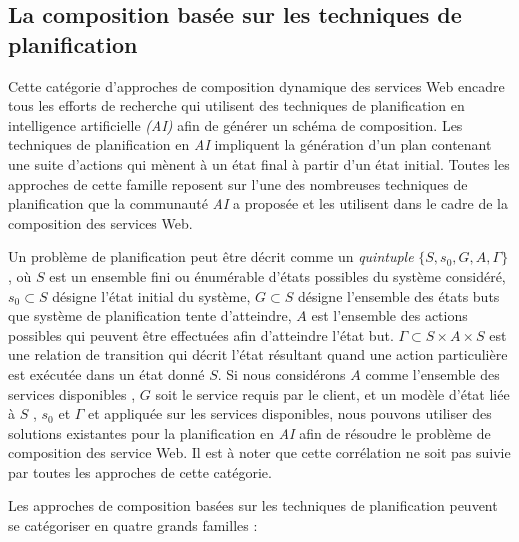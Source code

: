   \subsection{La composition basée sur les techniques de
    planification}
  \label{sec:tech-de-plan}
  Cette catégorie d'approches de composition dynamique des services Web
  encadre tous les efforts de recherche qui utilisent des techniques
  de planification en intelligence artificielle \textit{(AI)} afin de
  générer un schéma de composition. Les techniques de planification en
  \textit{AI} impliquent la génération d'un plan contenant une suite
  d'actions qui mènent à un état final à partir d'un état
  initial. Toutes les approches de cette famille reposent sur l'une
  des nombreuses techniques de planification que la communauté
  \textit{AI} a proposée et les utilisent dans le cadre de la
  composition des services Web.\medskip

  Un problème de planification peut être décrit comme un
  \textit{quintuple } \textit{$\{S, s_0,G, A, \Gamma\}$}
  \cite{carman2003web}, où $S$ est un ensemble fini ou énumérable
  d'états possibles du système considéré, $s_0\subset S$ désigne
  l'état initial du système, $G\subset S$ désigne l'ensemble des états
  buts que système de planification tente d'atteindre, $A$ est
  l'ensemble des actions possibles qui peuvent être effectuées afin
  d'atteindre l'état but.  \textit{$\Gamma \subset S \times A \times
    S$} est une relation de transition qui décrit l'état résultant
  quand une action particulière est exécutée dans un état donné
  $S$. Si nous considérons $A$ comme l'ensemble des services
  disponibles , $G$ soit le service requis par le client, et un modèle
  d'état liée à $S$ , $s_0$ et $\Gamma$ et appliquée sur les services
  disponibles, nous pouvons utiliser des solutions existantes pour la
  planification en \textit{AI} afin de résoudre le problème de
  composition des service Web. Il est à noter que cette corrélation ne
  soit pas suivie par toutes les approches de cette
  catégorie.\medskip

  Les approches de composition basées sur les techniques de
  planification peuvent se catégoriser en quatre grands familles
  \cite{baryannis2010}:

